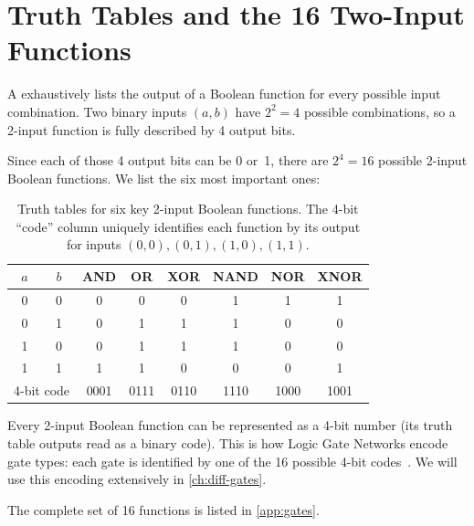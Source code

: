 \section{Truth Tables and the 16 Two-Input Functions}
\label{sec:truth-tables}

A  exhaustively lists the output of a Boolean
function for every possible input combination. Two binary inputs
$(a, b)$ have $2^2 = 4$ possible combinations, so a 2-input function
is fully described by 4 output bits.

Since each of those 4 output bits can be 0 or~1, there are
$2^4 = 16$ possible 2-input Boolean functions. We list the six most
important ones:

\begin{table}[htbp]
\centering
\caption{Truth tables for six key 2-input Boolean functions.
  The 4-bit ``code'' column uniquely identifies each function
  by its output for inputs $(0,0), (0,1), (1,0), (1,1)$.}
\label{tab:truth-tables}
\begin{tabular}{@{}cc|cccccc@{}}
  \toprule
  $a$ & $b$ & AND & OR & XOR & NAND & NOR & XNOR \\
  \midrule
  0 & 0 & 0 & 0 & 0 & 1 & 1 & 1 \\
  0 & 1 & 0 & 1 & 1 & 1 & 0 & 0 \\
  1 & 0 & 0 & 1 & 1 & 1 & 0 & 0 \\
  1 & 1 & 1 & 1 & 0 & 0 & 0 & 1 \\
  \midrule
  \multicolumn{2}{c|}{4-bit code} & 0001 & 0111 & 0110 & 1110 & 1000 & 1001 \\
  \bottomrule
\end{tabular}
\end{table}

\begin{keyinsight}
Every 2-input Boolean function can be represented as a 4-bit number
(its truth table outputs read as a binary code). This is how Logic
Gate Networks encode gate types: each gate is identified by one of the
16 possible 4-bit codes~\cite{petersen2022difflogic}. We will use this encoding extensively in
\cref{ch:diff-gates}.
\end{keyinsight}

The complete set of 16 functions is listed in \cref{app:gates}.


